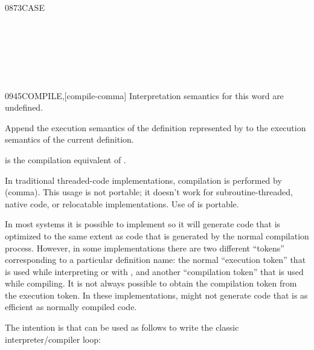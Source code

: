 \begin{worddef}{0873}{CASE}
\begin{testing}
		 \\
		 \\
		 \\
		 \\
		 \\
	\end{testing}
\end{worddef}

\vspace*{-.5ex}\enlargethispage{8ex}
\begin{worddef}{0945}{COMPILE,}[compile-comma]
\interpret
	Interpretation semantics for this word are undefined.

\execute

	Append the execution semantics of the definition represented
	by  to the execution semantics of the current
	definition.

	\begin{rationale} %
		 is the compilation equivalent of .

		In traditional threaded-code implementations, compilation is
		performed by \word{,} (comma). This usage is not portable; it
		doesn't work for subroutine-threaded, native code, or
		relocatable implementations. Use of  is portable.

		In most systems it is possible to implement  so
		it will generate code that is optimized to the same extent as
		code that is generated by the normal compilation process.
		However, in some implementations there are two different
		``tokens'' corresponding to a particular definition name:
		the normal ``execution token'' that is used while interpreting
		or with , and another ``compilation token'' that
		is used while compiling. It is not always possible to obtain
		the compilation token from the execution token. In these
		implementations,  might not generate code that
		is as efficient as normally compiled code.

		The intention is that  can be used as follows to write
		the classic interpreter/com\-piler loop:


\end{rationale}
\end{worddef}
